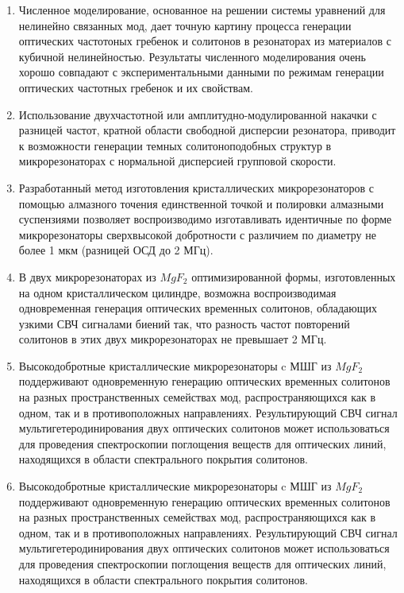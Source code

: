{}
\begin{enumerate}
  \item Численное моделирование, основанное на решении системы уравнений для нелинейно связанных мод, дает точную картину процесса генерации оптических частотоных гребенок и солитонов в резонаторах из материалов с кубичной нелинейностью. Результаты численного моделирования очень хорошо совпадают с экспериментальными данными по режимам генерации оптических частотных гребенок и их свойствам.
  \item Использование двухчастотной или амплитудно-модулированной накачки с разницей частот, кратной области свободной дисперсии резонатора, приводит к возможности генерации темных солитоноподобных структур в микрорезонаторах с нормальной дисперсией групповой скорости.
  \item Разработанный метод изготовления кристаллических микрорезонаторов с помощью алмазного точения единственной точкой и полировки алмазными суспензиями позволяет воспроизводимо изготавливать идентичные по форме микрорезонаторы сверхвысокой добротности с различием по диаметру не более 1 мкм (разницей ОСД до 2 МГц).
  \item В двух микрорезонаторах из $MgF_2$ оптимизированной формы, изготовленных на одном кристаллическом цилиндре, возможна воспроизводимая одновременная генерация оптических временных солитонов, обладающих узкими СВЧ сигналами биений так, что разность частот повторений солитонов в этих двух микрорезонаторах не превышает 2 МГц.
  \item Высокодобротные кристаллические микрорезонаторы c МШГ из $MgF_2$ поддерживают одновременную генерацию оптических временных солитонов на разных пространственных семействах мод, распространяющихся как в одном, так и в противоположных направлениях. Результирующий СВЧ сигнал мультигетеродинирования двух оптических солитонов может использоваться для проведения спектроскопии поглощения веществ для оптических линий, находящихся в области спектрального покрытия солитонов.
  \item Высокодобротные кристаллические микрорезонаторы c МШГ из $MgF_2$ поддерживают одновременную генерацию оптических временных солитонов на разных пространственных семействах мод, распространяющихся как в одном, так и в противоположных направлениях. Результирующий СВЧ сигнал мультигетеродинирования двух оптических солитонов может использоваться для проведения спектроскопии поглощения веществ для оптических линий, находящихся в области спектрального покрытия солитонов.
\end{enumerate}

